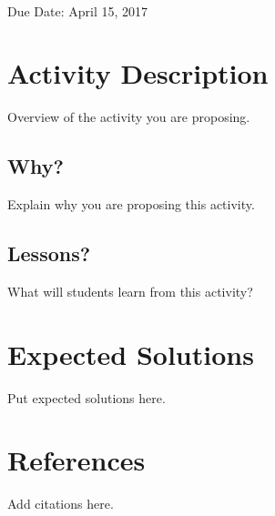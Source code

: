\documentclass[a4paper, 11pt]{article}
\begin{document}
 \\
         {\phantom{} \hfill Due Date: April 15, 2017} \\

\section{Activity Description}

Overview of the activity you are proposing.

\subsection{Why?}

Explain why you are proposing this activity.

\subsection{Lessons?}

What will students learn from this activity?

\section{Expected Solutions}

Put expected solutions here.

\section{References}

Add citations here.
\end{document}

